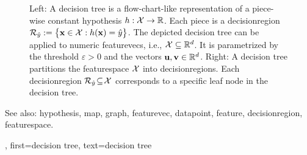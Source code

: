{{\begin{figure}[H]
\begin{minipage}{.45\textwidth}
\end{minipage}
	\caption{Left: A decision tree is a flow-chart-like representation of a piece-wise constant \gls{hypothesis} $h: \mathcal{X} \rightarrow \mathbb{R}$.  Each piece is a \gls{decisionregion} $\mathcal{R}_{\hat{y}} := \big\{ {\bf x} \in  \mathcal{X}: h({\bf x}) = \hat{y} \big\}$. 
		The depicted decision tree can be applied to numeric \glspl{featurevec}, i.e., $\mathcal{X} \subseteq \mathbb{R}^{d}$. It is  parametrized by the threshold $\varepsilon>0$ and the vectors ${\bf u}, {\bf v} \in \mathbb{R}^{d}$. 
		Right: A decision tree partitions  
		the \gls{featurespace} $\mathcal{X}$ into \glspl{decisionregion}. Each \gls{decisionregion}  
		$\mathcal{R}_{\hat{y}} \!\subseteq\!\mathcal{X}$ corresponds to a specific leaf node in the decision tree.}
	\label{fig_decision_tree}
\end{figure} 
		See also: \gls{hypothesis}, \gls{map}, \gls{graph}, \gls{featurevec}, \gls{datapoint}, \gls{feature}, \gls{decisionregion}, \gls{featurespace}.},
	  first={decision tree},
	  text={decision tree} 
}


